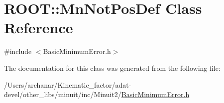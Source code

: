 \hypertarget{classROOT_1_1Minuit2_1_1BasicMinimumError_1_1MnNotPosDef}{}\section{R\+O\+OT\+:\+:Mn\+Not\+Pos\+Def Class Reference}
\label{classROOT_1_1Minuit2_1_1BasicMinimumError_1_1MnNotPosDef}


{\ttfamily \#include $<$Basic\+Minimum\+Error.\+h$>$}



The documentation for this class was generated from the following file\+:\begin{DoxyCompactItemize}
\item 
/\+Users/archanar/\+Kinematic\+\_\+factor/adat-\/devel/other\+\_\+libs/minuit/inc/\+Minuit2/\mbox{\hyperlink{adat-devel_2other__libs_2minuit_2inc_2Minuit2_2BasicMinimumError_8h}{Basic\+Minimum\+Error.\+h}}\end{DoxyCompactItemize}
